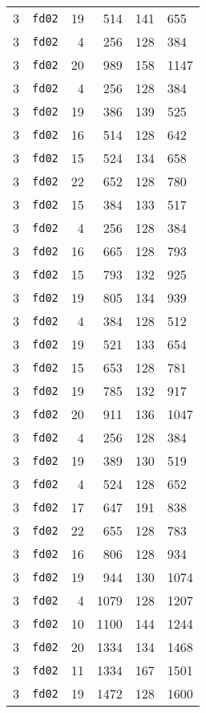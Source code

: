 \documentclass{article}
\begin{document}
\begin{table}[h!]
\begin{tabular}{llrrrl}
    3 & \texttt{fd02} & 19 & 514 & 141 & 655 \\
    3 & \texttt{fd02} & 4 & 256 & 128 & 384 \\
    3 & \texttt{fd02} & 20 & 989 & 158 & 1147 \\
    3 & \texttt{fd02} & 4 & 256 & 128 & 384 \\
    3 & \texttt{fd02} & 19 & 386 & 139 & 525 \\
    3 & \texttt{fd02} & 16 & 514 & 128 & 642 \\
    3 & \texttt{fd02} & 15 & 524 & 134 & 658 \\
    3 & \texttt{fd02} & 22 & 652 & 128 & 780 \\
    3 & \texttt{fd02} & 15 & 384 & 133 & 517 \\
    3 & \texttt{fd02} & 4 & 256 & 128 & 384 \\
    3 & \texttt{fd02} & 16 & 665 & 128 & 793 \\
    3 & \texttt{fd02} & 15 & 793 & 132 & 925 \\
    3 & \texttt{fd02} & 19 & 805 & 134 & 939 \\
    3 & \texttt{fd02} & 4 & 384 & 128 & 512 \\
    3 & \texttt{fd02} & 19 & 521 & 133 & 654 \\
    3 & \texttt{fd02} & 15 & 653 & 128 & 781 \\
    3 & \texttt{fd02} & 19 & 785 & 132 & 917 \\
    3 & \texttt{fd02} & 20 & 911 & 136 & 1047 \\
    3 & \texttt{fd02} & 4 & 256 & 128 & 384 \\
    3 & \texttt{fd02} & 19 & 389 & 130 & 519 \\
    3 & \texttt{fd02} & 4 & 524 & 128 & 652 \\
    3 & \texttt{fd02} & 17 & 647 & 191 & 838 \\
    3 & \texttt{fd02} & 22 & 655 & 128 & 783 \\
    3 & \texttt{fd02} & 16 & 806 & 128 & 934 \\
    3 & \texttt{fd02} & 19 & 944 & 130 & 1074 \\
    3 & \texttt{fd02} & 4 & 1079 & 128 & 1207 \\
    3 & \texttt{fd02} & 10 & 1100 & 144 & 1244 \\
    3 & \texttt{fd02} & 20 & 1334 & 134 & 1468 \\
    3 & \texttt{fd02} & 11 & 1334 & 167 & 1501 \\
    3 & \texttt{fd02} & 19 & 1472 & 128 & 1600 \\

\end{tabular}
\end{table}
\end{document}
